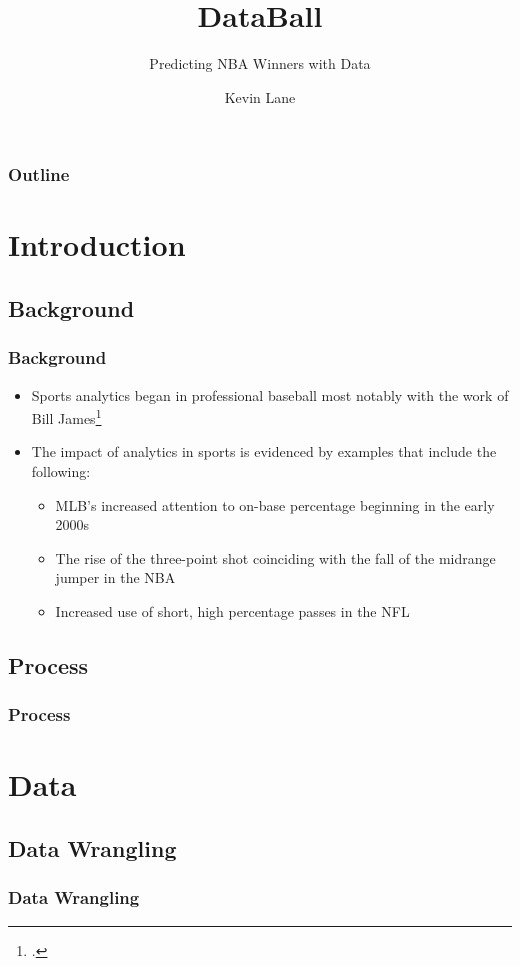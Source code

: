 \documentclass{beamer}
\title{DataBall}
\subtitle{Predicting NBA Winners with Data}
\author{Kevin Lane}
\begin{document}
\begin{frame}
\titlepage
\end{frame}

\begin{frame}
\frametitle{Outline}
\tableofcontents
\end{frame}

\section{Introduction}

\subsection{Background}
\begin{frame}[t]
\frametitle{Background}
\begin{itemize}
    \item Sports analytics began in professional baseball most notably with the work of Bill James\footcite{james}
    \item The impact of analytics in sports is evidenced by examples that include the following:
    \begin{itemize}
        \item MLB's increased attention to on-base percentage beginning in the early 2000s
        \item The rise of the three-point shot coinciding with the fall of the midrange jumper in the NBA
        \item Increased use of short, high percentage passes in the NFL
    \end{itemize}
\end{itemize}
\end{frame}

\subsection{Process}
\begin{frame}[t]
\frametitle{Process}
\end{frame}

\section{Data}

\subsection{Data Wrangling}
\begin{frame}[t]
\frametitle{Data Wrangling}
\end{frame}
\end{document}
